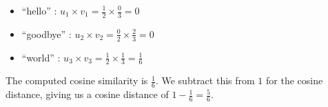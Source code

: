 \begin{itemize}
  \item ``hello'' : $ u_1 \times v_1 = \frac12 \times \frac03 = 0$
  \item ``goodbye'' : $ u_2 \times v_2 = \frac02 \times\frac23 = 0$
  \item ``world'' : $ u_3 \times v_3 = \frac12\times\frac13 = \frac16$
\end{itemize}

\noindent The computed cosine similarity is $\frac16$. We subtract this from $1$
for the cosine distance, giving us a cosine distance of $1-\frac16 = \frac56$.
